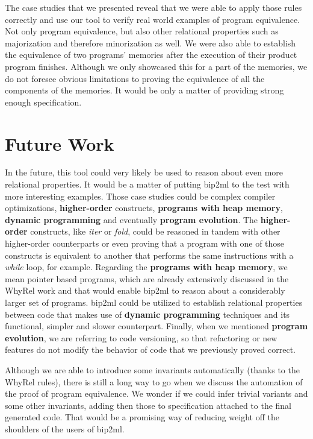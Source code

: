 The case studies that we presented reveal that we were able to apply those rules correctly and use our tool to verify real world examples of program equivalence.
Not only program equivalence, but also other relational properties such as majorization and therefore minorization as well.
We were also able to establish the equivalence of two programs' memories after the execution of their product program finishes.
Although we only showcased this for a part of the memories, we do not foresee obvious limitations to proving the equivalence of all the components of the memories.
It would be only a matter of providing strong enough specification.


\section{Future Work}
\label{sec:future}

In the future, this tool could very likely be used to reason about even more relational properties.
It would be a matter of putting bip2ml to the test with more interesting examples.
Those case studies could be complex compiler optimizations, \textbf{higher-order} constructs, \textbf{programs with heap memory}, \textbf{dynamic programming} and eventually \textbf{program evolution}.
The \textbf{higher-order} constructs, like \emph{iter} or \emph{fold}, could be reasoned in tandem with other higher-order counterparts or even proving that a program with one of those constructs is equivalent to another that performs the same instructions with a \emph{while} loop, for example. 
Regarding the \textbf{programs with heap memory}, we mean pointer based programs, which are already extensively discussed in the WhyRel work and that would enable bip2ml to reason about a considerably larger set of programs.
bip2ml could be utilized to establish relational properties between code that makes use of \textbf{dynamic programming} techniques and its functional, simpler and slower counterpart.
Finally, when we mentioned \textbf{program evolution}, we are referring to code versioning, so that refactoring or new features do not modify the behavior of code that we previously proved correct.

Although we are able to introduce some invariants automatically (thanks to the WhyRel rules), there is still a long way to go when we discuss the automation of the proof of program equivalence.
We wonder if we could infer trivial variants and some other invariants, adding then those to specification attached to the final generated code.
That would be a promising way of reducing weight off the shoulders of the users of bip2ml.
